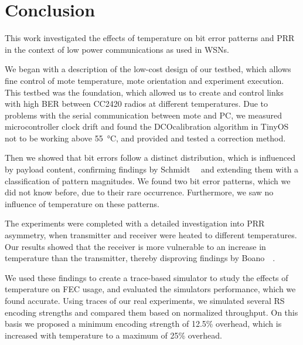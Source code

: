 \chapter{Conclusion}

This work investigated the effects of temperature on bit error patterns and \ac{PRR} in the context of low power communications as used in \acp{WSN}.

We began with a description of the low-cost design of our testbed, which allows fine control of mote temperature, mote orientation and experiment execution.
This testbed was the foundation, which allowed us to create and control links with high \ac{BER} between CC2420 radios at different temperatures.
Due to problems with the serial communication between mote and PC, we measured microcontroller clock drift and found the \ac{DCO}calibration algorithm in TinyOS not to be working above \SI{55}{\celsius}, and provided and tested a correction method.

Then we showed that bit errors follow a distinct distribution, which is influenced by payload content, confirming findings by Schmidt~\etal~\cite{Schmidt2013} and extending them with a classification of pattern magnitudes.
We found two bit error patterns, which we did not know before, due to their rare occurrence.
Furthermore, we saw no influence of temperature on these patterns.

The experiments were completed with a detailed investigation into \ac{PRR} asymmetry, when transmitter and receiver were heated to different temperatures.
Our results showed that the receiver is more vulnerable to an increase in temperature than the transmitter, thereby disproving findings by Boano~\etal~\cite{Boano2013}.

We used these findings to create a trace-based simulator to study the effects of temperature on \ac{FEC} usage, and evaluated the simulators performance, which we found accurate.
Using traces of our real experiments, we simulated several \ac{RS} encoding strengths and compared them based on normalized throughput.
On this basis we proposed a minimum encoding strength of 12.5\% overhead, which is increased with temperature to a maximum of 25\% overhead.




